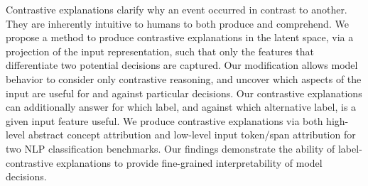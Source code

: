 Contrastive explanations clarify why an event occurred in contrast to another. They are inherently intuitive to humans to both produce and comprehend. We propose a method to produce contrastive explanations in the latent space, via a projection of the input representation, such that only the features that differentiate two potential decisions are captured. Our modification allows model behavior to consider only contrastive reasoning, and uncover which aspects of the input are useful for and against particular decisions. Our contrastive explanations can additionally answer for which label, and against which alternative label, is a given input feature useful. We produce contrastive explanations via both high-level abstract concept attribution and low-level input token/span attribution for two NLP classification benchmarks. Our findings demonstrate the ability of label-contrastive explanations to provide fine-grained interpretability of model decisions.
